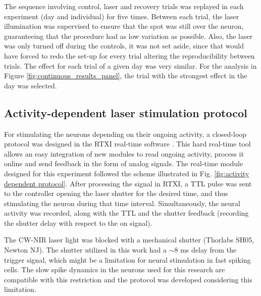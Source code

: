 The sequence involving control, laser and recovery trials was replayed in each experiment (day and individual) for five times. Between each trial, the laser illumination was supervised to ensure that the spot was still over the neuron, guaranteeing that the procedure had as low variation as possible. Also, the laser was only turned off during the controls, it was not set aside, since that would have forced to redo the set-up for every trial altering the reproducibility between trials. The effect for each trial of a given day was very similar. For the analysis in Figure \ref{fig:continuous_results_panel}, the trial with the strongest effect in the day was selected.



\subsection{Activity-dependent laser stimulation protocol} 
\label{sect:methods-activity-dependent}

For stimulating the neurons depending on their ongoing activity, a closed-loop protocol was designed in the RTXI real-time software \parencite{patel_hard_2017}. This hard real-time tool allows an easy integration of new modules to read ongoing activity, process it online and send feedback in the form of analog signals. The real-time module designed for this experiment followed the scheme illustrated in Fig. \ref{fig:activity dependent protocol}. After processing the signal in RTXI, a TTL pulse was sent to the controller opening the laser shutter for the desired time, and thus stimulating the neuron during that time interval. Simultaneously, the neural activity was recorded, along with the TTL and the shutter feedback (recording the shutter delay with respect to the on signal).

The CW-NIR laser light was blocked with a mechanical shutter (Thorlabs SH05, Newton NJ). The shutter utilized in this work had a $\sim 8$ ms delay from the trigger signal, which might be a limitation for neural stimulation in fast spiking cells. The slow spike dynamics in the neurons used for this research are compatible with this restriction and the protocol was developed considering this limitation. 


